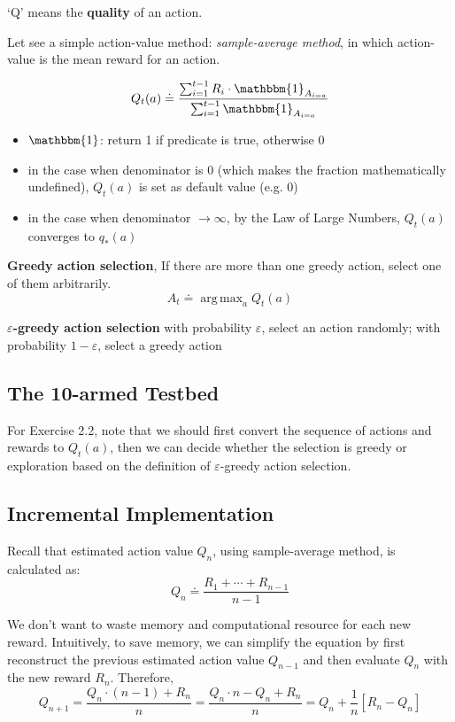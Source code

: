 \documentclass[lang=en,mode=geye,device=normal,color=blue,14pt]{elegantnote}
\DeclareMathOperator*{\1}{\mathbbm{1}}
\DeclareMathOperator*{\argmax}{arg\,max}
\begin{document}
`Q' means the \textbf{quality} of an action.

Let see a simple action-value method: \textit{sample-average method}, in which action-value is the mean reward for an action.

$$ Q_t(a) \doteq \frac{\sum_{i=1}^{t-1}R_i \cdot \1_{A_{i=a}}}{\sum_{i=1}^{t-1}\1_{A_{i=a}}}$$

\begin{itemize}
	\item $\1$: return 1 if predicate is true, otherwise 0
	\item in the case when denominator is 0 (which makes the fraction mathematically undefined), $Q_t(a)$ is set as default value (e.g. 0)
	\item in the case when denominator $\rightarrow \infty$, by the Law of Large Numbers, $Q_t(a)$ converges to $q_*(a)$
\end{itemize}

\begin{definition}
\textbf{Greedy action selection}, If there are more than one greedy action, select one of them arbitrarily.
$$ A_t \doteq \argmax_{a} Q_t(a) $$
\end{definition}

\begin{definition}
\textbf{$\varepsilon$-greedy action selection} with probability $\varepsilon$, select an action randomly; with probability $1-\varepsilon$, select a greedy action
\end{definition}

\subsection{The 10-armed Testbed}

For Exercise 2.2, note that we should first convert the sequence of actions and rewards to $Q_t(a)$, then we can decide whether the selection is greedy or exploration based on the definition of $\varepsilon$-greedy action selection.

\subsection{Incremental Implementation}

Recall that estimated action value $Q_n$, using sample-average method, is calculated as:
$$ Q_n \doteq \frac{R_1 + \cdots + R_{n-1}}{n-1} $$

We don't want to waste memory and computational resource for each new reward.
Intuitively, to save memory, we can simplify the equation by first reconstruct the previous estimated action value $Q_{n-1}$ and then evaluate $Q_n$ with the new reward $R_n$.
Therefore,
$$ Q_{n+1} = \frac{Q_n \cdot (n-1) + R_n}{n} = \frac{Q_n \cdot n - Q_n + R_n}{n} = Q_n + \frac{1}{n}[R_n - Q_n] $$
\end{document}
